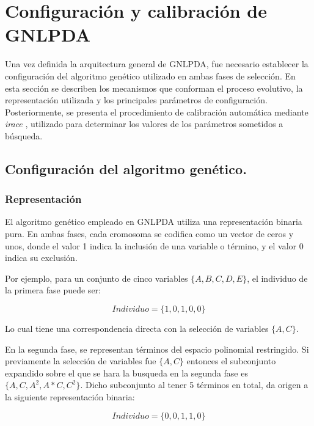 \section{Configuración y calibración de GNLPDA}

Una vez definida la arquitectura general de GNLPDA, fue necesario establecer la configuración del algoritmo genético utilizado en ambas fases de selección. En esta sección se describen los mecanismos que conforman el proceso evolutivo, la representación utilizada y los principales parámetros de configuración. Posteriormente, se presenta el procedimiento de calibración automática mediante \textit{irace} \cite{lopez2016irace}, utilizado para determinar los valores de los parámetros sometidos a búsqueda.

\subsection{Configuración del algoritmo genético.}

\subsubsection{Representación}

El algoritmo genético empleado en GNLPDA utiliza una representación binaria pura. En ambas fases, cada cromosoma se codifica como un vector de ceros y unos, donde el valor 1 indica la inclusión de una variable o término, y el valor 0 indica su exclusión.

Por ejemplo, para un conjunto de cinco variables $\{A,B,C,D,E\}$, el individuo de la primera fase puede ser:

\begin{equation}
	Individuo = \{1,0,1,0,0\}
	\label{eq:EMN1}
\end{equation}

Lo cual tiene una correspondencia directa con la selección de variables $\{A,C\}$.

En la segunda fase, se representan términos del espacio polinomial restringido. Si previamente la selección de variables fue $\{A,C\}$ entonces el subconjunto expandido sobre el que se hara la busqueda en la segunda fase es $\{A,C,A^2,A*C,C^2\}$. Dicho subconjunto al tener 5 términos en total, da origen a la siguiente representación binaria:

\begin{equation}
	Individuo = \{0,0,1,1,0\}
	\label{eq:EMN2}
\end{equation}

